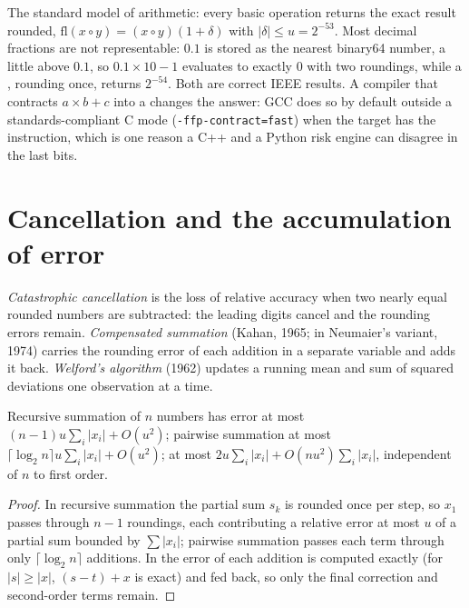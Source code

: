 The standard model of arithmetic: every basic operation returns the exact result rounded, $\mathrm{fl}(x \circ y) = (x \circ y)(1 + \delta)$ with $|\delta| \le u = 2^{-53}$. Most decimal
fractions are not representable: $0.1$ is stored as the nearest binary64 number, a little above $0.1$, so $0.1 \times 10 - 1$ evaluates to exactly 0 with two roundings, while a , rounding once, returns $2^{-54}$. Both are correct IEEE results. A compiler that contracts $a \times b + c$ into a  changes the answer: GCC does so by
default outside a standards-compliant C mode (\texttt{-ffp-contract=fast}) when the target has the instruction, which is one reason a C++ and a Python risk engine can disagree in
the last bits.

\section{Cancellation and the accumulation of error}

\begin{definition}\label{def:qm:floating-point-and-numerical-linear-algebra:cancel}
\emph{Catastrophic cancellation} is the loss of relative accuracy when two nearly equal rounded numbers are subtracted: the leading digits cancel and the
rounding errors remain. \emph{Compensated summation} (Kahan, 1965; in Neumaier's variant, 1974) carries the rounding error of each addition in a separate
variable and adds it back. \emph{Welford's algorithm} (1962) updates a running mean and sum of squared deviations one observation at a time.
\end{definition}

\begin{proposition}\label{prop:qm:floating-point-and-numerical-linear-algebra:sum}
Recursive summation of $n$ numbers has error at most $(n - 1)u\sum_i|x_i| + O(u^2)$; pairwise summation at most $\lceil\log_2n\rceil u\sum_i|x_i| + O(u^2)$;  at most
$2u\sum_i|x_i| + O(nu^2)\sum_i|x_i|$, independent of $n$ to first order.
\end{proposition}

\begin{proof}
In recursive summation the partial sum $s_k$ is rounded once per step, so $x_1$ passes through $n - 1$ roundings, each contributing a relative error at most $u$ of a partial sum bounded by
$\sum|x_i|$; pairwise summation passes each term through only $\lceil\log_2n\rceil$ additions. In  the error of each addition is computed exactly (for $|s| \ge |x|$,
$(s - t) + x$ is exact) and fed back, so only the final correction and second-order terms remain.
\end{proof}


